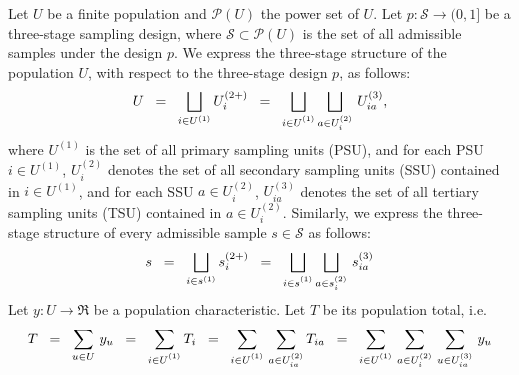 Let $U$ be a finite population and $\mathcal{P}(U)$ the power set of $U$.
Let $p : \mathcal{S} \longrightarrow (0,1]$ be a three-stage sampling design,
where $\mathcal{S} \subset \mathcal{P}(U)$ is the set of all admissible samples under the design $p$.
We express the three-stage structure of the population $U$, with respect to the three-stage design $p$, as follows:
\begin{equation}
U
\;\;=\;\; \bigsqcup_{i \in U^{(1)}} U^{(2+)}_{i}
\;\;=\;\; \bigsqcup_{i \in U^{(1)}_{\color{white}i}} \bigsqcup_{a \in U^{(2)}_{i}}\, U^{(3)}_{ia},
\end{equation}
where $U^{(1)}$ is the set of all primary sampling units (PSU),
and for each PSU $i \in U^{(1)}$, $U^{(2)}_{i}$ denotes the set of all secondary sampling units (SSU) contained in $i \in U^{(1)}$,
and for each SSU $a \in U^{(2)}_{i}$, $U^{(3)}_{ia}$ denotes the set of all tertiary sampling units (TSU) contained in $a \in U^{(2)}_{i}$.
Similarly, we express the three-stage structure of every admissible sample $s \in \mathcal{S}$ as follows:
\begin{equation}
s
\;\;=\;\; \bigsqcup_{i\in s^{(1)}} s^{(2+)}_{i}
\;\;=\;\; \bigsqcup_{i\in s^{(1)}_{\color{white}i}} \bigsqcup_{a \in s^{(2)}_{i}}\, s^{(3)}_{ia}
\end{equation}
Let $y : U \longrightarrow \Re$ be a population characteristic.
Let $T$ be its population total, i.e.
\begin{equation}
T
\;\;=\;\; \sum_{u\in U}\,y_{u}
\;\;=\;\; \sum_{i\in U^{(1)}_{\color{white} i}}T_{i}
\;\;=\;\; \sum_{i\in U^{(1)}_{\color{white} i}}\,\sum_{a \in U^{(2)}_{ia}}T_{ia}
\;\;=\;\; \sum_{i \in U^{(1)}_{\color{white} i}}\,\sum_{a \in U^{(2)}_{i}}\,\sum_{u \in U^{(3)}_{ia}}\,y_{u}
\end{equation}

